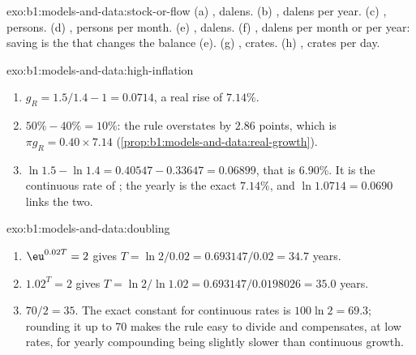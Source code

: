 \begin{solution}{exo:b1:models-and-data:stock-or-flow}
(a) , dalens. (b) , dalens per year. (c) , persons.
(d) , persons per month. (e) , dalens. (f) , dalens per month
or per year: saving is the  that changes the balance (e). (g) ,
crates. (h) , crates per day.
\end{solution}

\begin{solution}{exo:b1:models-and-data:high-inflation}
\begin{enumerate}
  \item $g_R = 1.5/1.4 - 1 = 0.0714$, a real rise of $7.14\%$.
  \item $50\% - 40\% = 10\%$: the rule overstates by $2.86$ points, which is
    $\pi g_R = 0.40 \times 7.14$ (\cref{prop:b1:models-and-data:real-growth}).
  \item $\ln 1.5 - \ln 1.4 = 0.40547 - 0.33647 = 0.06899$, that is $6.90\%$.
    It is the continuous rate of ; the yearly  is the
    exact $7.14\%$, and $\ln 1.0714 = 0.0690$ links the two.
\end{enumerate}
\end{solution}

\begin{solution}{exo:b1:models-and-data:doubling}
\begin{enumerate}
  \item $\eu^{0.02T} = 2$ gives $T = \ln 2/0.02 = 0.693147/0.02 = 34.7$ years.
  \item $1.02^T = 2$ gives $T = \ln 2/\ln 1.02 = 0.693147/0.0198026 = 35.0$ years.
  \item $70/2 = 35$. The exact constant for continuous rates is
    $100 \ln 2 = 69.3$; rounding it up to 70 makes the rule easy to divide and
    compensates, at low rates, for yearly compounding being slightly slower
    than continuous growth.
\end{enumerate}
\end{solution}

